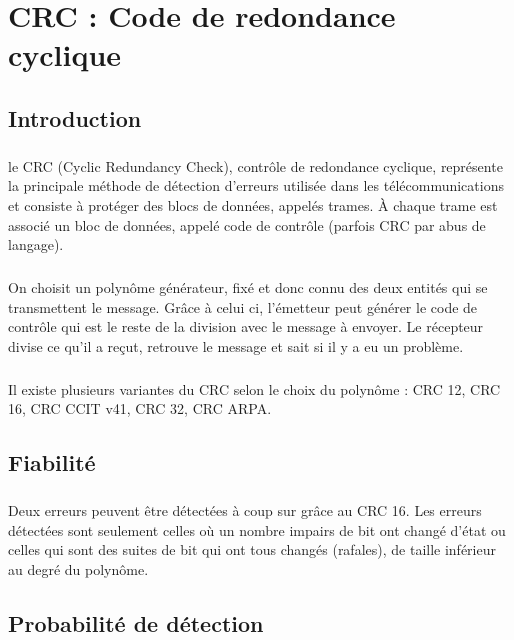 
\chapter{CRC : Code de redondance cyclique}

    \section{Introduction}

        \paragraph{}
le CRC (Cyclic Redundancy Check), contrôle de redondance cyclique,
représente la principale méthode de détection d'erreurs utilisée dans les télécommunications et
consiste à protéger des blocs de données, appelés trames.
À chaque trame est associé un bloc de données, appelé code de contrôle (parfois CRC par abus de langage).
        \paragraph{}
On choisit un polynôme générateur, fixé et donc connu des deux entités qui se transmettent le message.
Grâce à celui ci, l'émetteur peut générer le code de contrôle qui est le reste de la division avec le message à envoyer.
Le récepteur divise ce qu'il a reçut, retrouve le message et sait si il y a eu un problème.
        \paragraph{}
Il existe plusieurs variantes du CRC selon le choix du polynôme : CRC 12, CRC 16, CRC CCIT v41, CRC 32, CRC ARPA.


    \section{Fiabilité}

        \paragraph{}
Deux erreurs peuvent être détectées à coup sur grâce au CRC 16.
Les erreurs détectées sont seulement celles où un nombre impairs de bit ont changé d'état ou
celles qui sont des suites de bit qui ont tous changés (rafales), de taille inférieur au
degré du polynôme.


    \section{Probabilité de détection}

